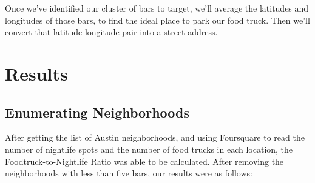 \documentclass{deagle}
\begin{document}
Once we've identified our cluster of bars to target, we'll average the latitudes and longitudes of those bars, to find the ideal place to park our food truck. Then we'll convert that latitude-longitude-pair into a street address.

\section*{Results}

\subsection*{Enumerating Neighborhoods}

After getting the list of Austin neighborhoods, and using Foursquare to read the number of nightlife spots and the number of food trucks in each location, the Foodtruck-to-Nightlife Ratio was able to be calculated. After removing the neighborhoods with less than five bars, our results were as follows:
\end{document}
